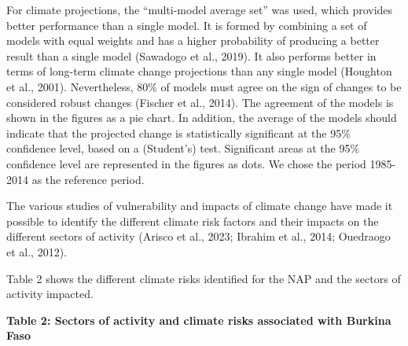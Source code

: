 \documentclass[
]{book}
\begin{document}
For climate projections, the ``multi-model average set'' was used, which provides better performance than a single model. It is formed by combining a set of models with equal weights and has a higher probability of producing a better result than a single model (Sawadogo et al., 2019). It also performs better in terms of long-term climate change projections than any single model (Houghton et al., 2001). Nevertheless, 80\% of models must agree on the sign of changes to be considered robust changes (Fischer et al., 2014). The agreement of the models is shown in the figures as a pie chart. In addition, the average of the models should indicate that the projected change is statistically significant at the 95\% confidence level, based on a (Student's) test. Significant areas at the 95\% confidence level are represented in the figures as dots. We chose the period 1985-2014 as the reference period.

The various studies of vulnerability and impacts of climate change have made it possible to identify the different climate risk factors and their impacts on the different sectors of activity (Arisco et al., 2023; Ibrahim et al., 2014; Ouedraogo et al., 2012).

Table 2 shows the different climate risks identified for the NAP and the sectors of activity impacted.

\textbf{Table 2: Sectors of activity and climate risks associated with Burkina Faso}
\end{document}
